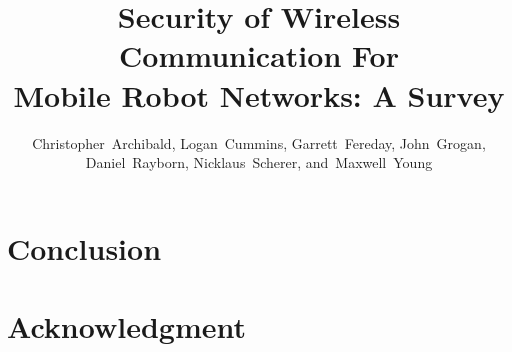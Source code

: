 \documentclass[journal]{IEEEtran}
\begin{document}
\title{Security of Wireless Communication For \\Mobile Robot Networks: A Survey}

\author{Christopher~Archibald,
		Logan~Cummins,
		Garrett~Fereday,
        John~Grogan,
        Daniel~Rayborn,
        Nicklaus~Scherer,
        and~Maxwell~Young%
}

\maketitle

\begin{abstract}
\end{abstract}

\begin{IEEEkeywords}
\end{IEEEkeywords}









\IEEEpeerreviewmaketitle

\section{Conclusion}

\section*{Acknowledgment}



\end{document}
